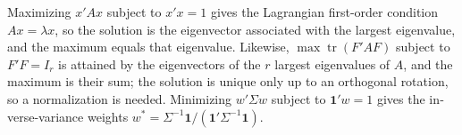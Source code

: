 \begin{english}
Maximizing $x'Ax$ subject to $x'x=1$ gives the Lagrangian first-order condition $Ax=\lambda x$, so the solution is the eigenvector associated with the largest eigenvalue, and the maximum equals that eigenvalue. Likewise, $\max\operatorname{tr}(F'AF)$ subject to $F'F=I_r$ is attained by the eigenvectors of the $r$ largest eigenvalues of $A$, and the maximum is their sum; the solution is unique only up to an orthogonal rotation, so a normalization is needed. Minimizing $w'\Sigma w$ subject to $\mathbf 1'w=1$ gives the inverse-variance weights $w^*=\Sigma^{-1}\mathbf 1/(\mathbf 1'\Sigma^{-1}\mathbf 1)$.
\end{english}
